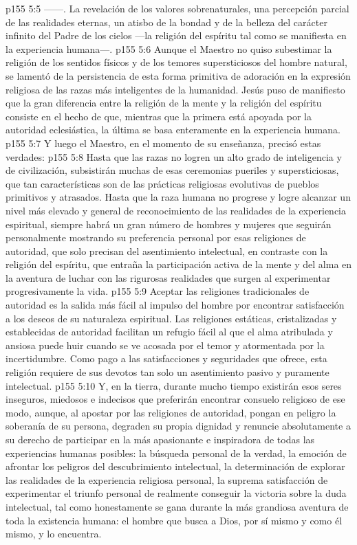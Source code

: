 \vs p155 5:5  ------. La revelación de los valores sobrenaturales, una percepción parcial de las realidades eternas, un atisbo de la bondad y de la belleza del carácter infinito del Padre de los cielos ---la religión del espíritu tal como se manifiesta en la experiencia humana---.
\vs p155 5:6 \pc Aunque el Maestro no quiso subestimar la religión de los sentidos físicos y de los temores supersticiosos del hombre natural, se lamentó de la persistencia de esta forma primitiva de adoración en la expresión religiosa de las razas más inteligentes de la humanidad. Jesús puso de manifiesto que la gran diferencia entre la religión de la mente y la religión del espíritu consiste en el hecho de que, mientras que la primera está apoyada por la autoridad eclesiástica, la última se basa enteramente en la experiencia humana.
\vs p155 5:7 \pc Y luego el Maestro, en el momento de su enseñanza, precisó estas verdades:
\vs p155 5:8 \pc Hasta que las razas no logren un alto grado de inteligencia y de civilización, subsistirán muchas de esas ceremonias pueriles y supersticiosas, que tan características son de las prácticas religiosas evolutivas de pueblos primitivos y atrasados. Hasta que la raza humana no progrese y logre alcanzar un nivel más elevado y general de reconocimiento de las realidades de la experiencia espiritual, siempre habrá un gran número de hombres y mujeres que seguirán personalmente mostrando su preferencia personal por esas religiones de autoridad, que solo precisan del asentimiento intelectual, en contraste con la religión del espíritu, que entraña la participación activa de la mente y del alma en la aventura de luchar con las rigurosas realidades que surgen al experimentar progresivamente la vida.
\vs p155 5:9 Aceptar las religiones tradicionales de autoridad es la salida más fácil al impulso del hombre por encontrar satisfacción a los deseos de su naturaleza espiritual. Las religiones estáticas, cristalizadas y establecidas de autoridad facilitan un refugio fácil al que el alma atribulada y ansiosa puede huir cuando se ve acosada por el temor y atormentada por la incertidumbre. Como pago a las satisfacciones y seguridades que ofrece, esta religión requiere de sus devotos tan solo un asentimiento pasivo y puramente intelectual.
\vs p155 5:10 Y, en la tierra, durante mucho tiempo existirán esos seres inseguros, miedosos e indecisos que preferirán encontrar consuelo religioso de ese modo, aunque, al apostar por las religiones de autoridad, pongan en peligro la soberanía de su persona, degraden su propia dignidad y renuncie absolutamente a su derecho de participar en la más apasionante e inspiradora de todas las experiencias humanas posibles: la búsqueda personal de la verdad, la emoción de afrontar los peligros del descubrimiento intelectual, la determinación de explorar las realidades de la experiencia religiosa personal, la suprema satisfacción de experimentar el triunfo personal de realmente conseguir la victoria sobre la duda intelectual, tal como honestamente se gana durante la más grandiosa aventura de toda la existencia humana: el hombre que busca a Dios, por sí mismo y como él mismo, y lo encuentra.
